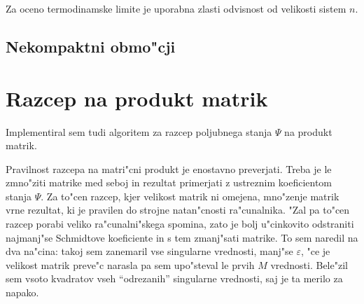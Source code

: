 \documentclass[a4paper,10pt]{article}
\begin{document}
Za oceno termodinamske limite je uporabna zlasti odvisnost od velikosti sistem $n$. 

\subsection{Nekompaktni obmo"cji}


\section{Razcep na produkt matrik}

Implementiral sem tudi algoritem za razcep poljubnega stanja $\Psi$ na produkt matrik. 

Pravilnost razcepa na matri"cni produkt je enostavno preverjati. 
Treba je le zmno"ziti matrike med seboj in rezultat primerjati z ustreznim koeficientom stanja $\Psi$. 
Za to"cen razcep, kjer velikost matrik ni omejena, mno"zenje matrik vrne rezultat, ki je pravilen do strojne natan"cnosti ra"cunalnika. 
"Zal pa to"cen razcep porabi veliko ra"cunalni"skega spomina, zato je bolj u"cinkovito odstraniti najmanj"se Schmidtove koeficiente in s tem zmanj"sati matrike. 
To sem naredil na dva na"cina: takoj sem zanemaril vse singularne vrednosti, manj"se $\varepsilon$, "ce je velikost matrik preve"c narasla pa sem upo"steval le prvih $M$ vrednosti. 
Bele"zil sem vsoto kvadratov vseh ``odrezanih'' singularne vrednosti, saj je ta merilo za napako. 
\end{document}
